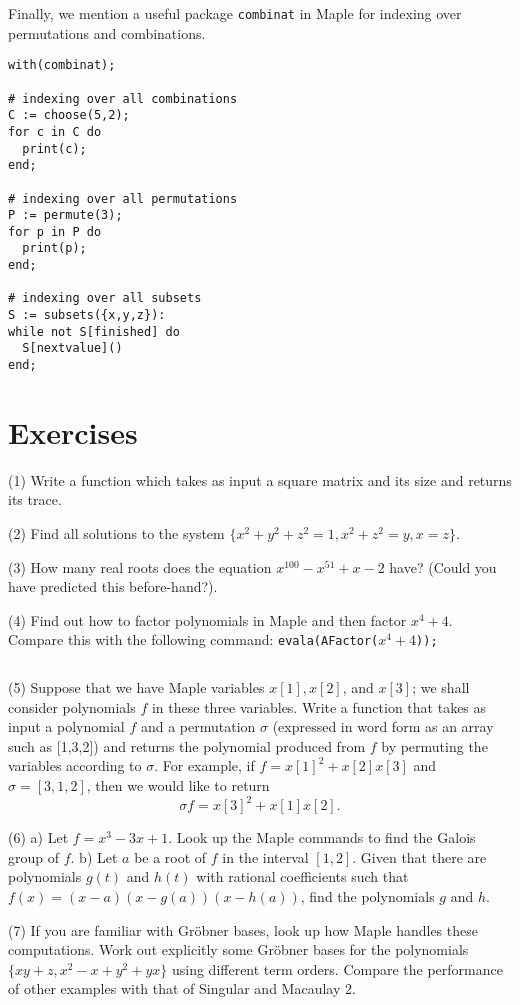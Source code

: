 \documentclass[12pt]{amsart}
\begin{document}
Finally, we mention a useful package \texttt{combinat} in Maple for 
indexing over permutations and combinations.

\begin{verbatim}
with(combinat);

# indexing over all combinations
C := choose(5,2);
for c in C do
  print(c);
end;

# indexing over all permutations
P := permute(3);
for p in P do
  print(p);
end;

# indexing over all subsets
S := subsets({x,y,z}):
while not S[finished] do 
  S[nextvalue]() 
end;
\end{verbatim}


\section{Exercises}

(1) Write a function which takes as input a square matrix and its size and returns its trace.
\[\]

(2) Find all solutions to the system $\{x^2+y^2+z^2=1, x^2+z^2 = y, x = z\}$.  
\[\]

(3) How many real roots does the equation $x^{100}-x^{51}+x-2$ have?
(Could you have predicted this before-hand?).
\[\]

(4) Find out how to factor polynomials in Maple and then factor $x^4+4$.  Compare this
with the following command:  \texttt{evala(AFactor($x^4+4$));}

\[\]

(5) Suppose that we have Maple variables $x[1],x[2]$, and $x[3]$; we shall consider polynomials
$f$ in these three variables.  Write a function that takes as input a polynomial $f$ and 
a permutation $\sigma$ (expressed in word form as an array such as [1,3,2]) and returns the polynomial
produced from $f$ by permuting the variables according to $\sigma$.  For example, if
$f = x[1]^2+x[2]x[3]$ and $\sigma = [3,1,2]$, then we would like to return \[ \sigma f =  x[3]^2+x[1]x[2].\]
\[\]

(6) a) Let $f =  x^3-3x+1$.  Look up the Maple commands to find the Galois group of $f$.  
b) Let $a$ be a root of $f$ in the interval $[1,2]$.  Given that there are polynomials $g(t)$ and $h(t)$ with 
rational coefficients such that $f(x) = (x-a)(x-g(a))(x-h(a))$, find the polynomials $g$ and $h$.
\[\]

(7)  If you are familiar with Gr\"obner bases, look up how Maple handles these computations.  Work
out explicitly some Gr\"obner bases for the polynomials $\{xy+z,x^2-x+y^2+yx\}$ using
different term orders.  Compare the performance of other examples with that of Singular and
Macaulay 2.
\end{document}
